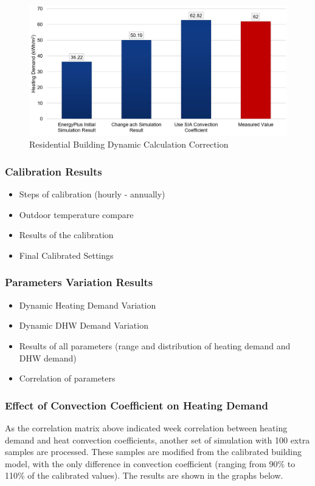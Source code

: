 \documentclass[11pt, a4paper]{article}
\theoremstyle{definition}
\begin{document}
		\begin{figure}[h!]
		\centering
		\includegraphics[scale=0.5]{Residential_EP.jpg}
		\caption{Residential Building Dynamic Calculation Correction}
		\label{fig:Hongger_EP}
		\end{figure}
		
		




		\subsubsection{Calibration Results}
			\begin{itemize}
				\item Steps of calibration (hourly - annually)
				\item Outdoor temperature compare
				\item Results of the calibration
				\item Final Calibrated Settings
			\end{itemize}
			
		\subsubsection{Parameters Variation Results}
			\begin{itemize}
				\item Dynamic Heating Demand Variation
				\item Dynamic DHW Demand Variation
				\item Results of all parameters (range and distribution of heating demand and DHW demand)
				\item Correlation of parameters
			\end{itemize}


		\subsubsection{Effect of Convection Coefficient on Heating Demand}
        	As the correlation matrix above indicated week correlation between heating demand and heat convection coefficients, another set of simulation with 100 extra samples are processed. These samples are modified from the calibrated building model, with the only difference in convection coefficient (ranging from 90\% to 110\% of the calibrated values). The results are shown in the graphs below.
\end{document}
